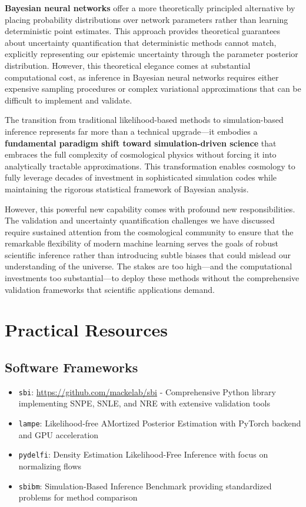 \documentclass{SciPost}
\begin{document}
\textbf{Bayesian neural networks} offer a more theoretically principled alternative by placing probability distributions over network parameters rather than learning deterministic point estimates. This approach provides theoretical guarantees about uncertainty quantification that deterministic methods cannot match, explicitly representing our epistemic uncertainty through the parameter posterior distribution. However, this theoretical elegance comes at substantial computational cost, as inference in Bayesian neural networks requires either expensive sampling procedures or complex variational approximations that can be difficult to implement and validate.

The transition from traditional likelihood-based methods to simulation-based inference represents far more than a technical upgrade—it embodies a \textbf{fundamental paradigm shift toward simulation-driven science} that embraces the full complexity of cosmological physics without forcing it into analytically tractable approximations. This transformation enables cosmology to fully leverage decades of investment in sophisticated simulation codes while maintaining the rigorous statistical framework of Bayesian analysis.

However, this powerful new capability comes with profound new responsibilities. The validation and uncertainty quantification challenges we have discussed require sustained attention from the cosmological community to ensure that the remarkable flexibility of modern machine learning serves the goals of robust scientific inference rather than introducing subtle biases that could mislead our understanding of the universe. The stakes are too high—and the computational investments too substantial—to deploy these methods without the comprehensive validation frameworks that scientific applications demand.

\section{Practical Resources}

\subsection{Software Frameworks}
\begin{itemize}
    \item \texttt{sbi}: \url{https://github.com/mackelab/sbi} - Comprehensive Python library implementing SNPE, SNLE, and NRE with extensive validation tools
    \item \texttt{lampe}: Likelihood-free AMortized Posterior Estimation with PyTorch backend and GPU acceleration
    \item \texttt{pydelfi}: Density Estimation Likelihood-Free Inference with focus on normalizing flows
    \item \texttt{sbibm}: Simulation-Based Inference Benchmark providing standardized problems for method comparison
\end{itemize}
\end{document}
